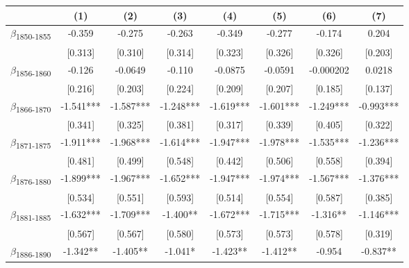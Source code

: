 {
\def\sym#1{\ifmmode^{#1}\else\(^{#1}\)\fi}
\begin{tabular}{l*{7}{c}}
\toprule
            &\multicolumn{1}{c}{(1)}   &\multicolumn{1}{c}{(2)}   &\multicolumn{1}{c}{(3)}   &\multicolumn{1}{c}{(4)}   &\multicolumn{1}{c}{(5)}   &\multicolumn{1}{c}{(6)}   &\multicolumn{1}{c}{(7)}   \\
\midrule
$\beta$\textsubscript{1850-1855}&      -0.359   &      -0.275   &      -0.263   &      -0.349   &      -0.277   &      -0.174   &       0.204   \\
            &     [0.313]   &     [0.310]   &     [0.314]   &     [0.323]   &     [0.326]   &     [0.326]   &     [0.203]   \\
$\beta$\textsubscript{1856-1860}&      -0.126   &     -0.0649   &      -0.110   &     -0.0875   &     -0.0591   &   -0.000202   &      0.0218   \\
            &     [0.216]   &     [0.203]   &     [0.224]   &     [0.209]   &     [0.207]   &     [0.185]   &     [0.137]   \\
$\beta$\textsubscript{1866-1870}&      -1.541***&      -1.587***&      -1.248***&      -1.619***&      -1.601***&      -1.249***&      -0.993***\\
            &     [0.341]   &     [0.325]   &     [0.381]   &     [0.317]   &     [0.339]   &     [0.405]   &     [0.322]   \\
$\beta$\textsubscript{1871-1875}&      -1.911***&      -1.968***&      -1.614***&      -1.947***&      -1.978***&      -1.535***&      -1.236***\\
            &     [0.481]   &     [0.499]   &     [0.548]   &     [0.442]   &     [0.506]   &     [0.558]   &     [0.394]   \\
$\beta$\textsubscript{1876-1880}&      -1.899***&      -1.967***&      -1.652***&      -1.947***&      -1.974***&      -1.567***&      -1.376***\\
            &     [0.534]   &     [0.551]   &     [0.593]   &     [0.514]   &     [0.554]   &     [0.587]   &     [0.385]   \\
$\beta$\textsubscript{1881-1885}&      -1.632***&      -1.709***&      -1.400** &      -1.672***&      -1.715***&      -1.316** &      -1.146***\\
            &     [0.567]   &     [0.567]   &     [0.580]   &     [0.573]   &     [0.573]   &     [0.578]   &     [0.319]   \\
$\beta$\textsubscript{1886-1890}&      -1.342** &      -1.405** &      -1.041*  &      -1.423** &      -1.412** &      -0.954   &      -0.837** \\

\end{tabular}}
